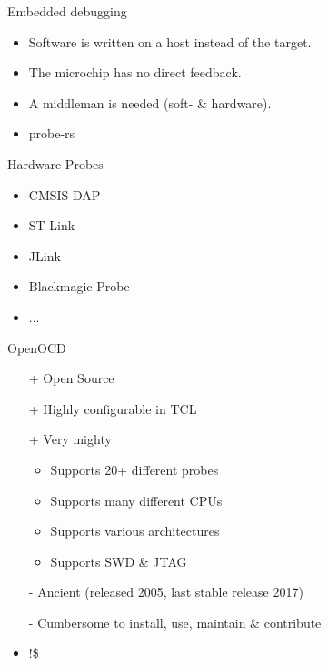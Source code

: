 \documentclass[aspectratio=1610,14pt,t]{beamer}
\begin{document}
\begin{frame}[c]{Embedded debugging}
  \begin{itemize}
    \item Software is written on a host instead of the target.
    \item The microchip has no direct feedback.
    \item A middleman is needed (soft- \& hardware).
    \item probe-rs
  \end{itemize}
\end{frame}

\begin{frame}[c]{Hardware Probes}
  \begin{itemize}
    \item CMSIS-DAP
    \item ST-Link
    \item JLink
    \item Blackmagic Probe
    \item ...
  \end{itemize}
\end{frame}

\begin{frame}[c]{OpenOCD}
  \begin{itemize}
    \item[+] Open Source
    \item[+] Highly configurable in TCL
    \item[+] Very mighty
      \begin{itemize}
        \item Supports 20+ different probes
        \item Supports many different CPUs
        \item Supports various architectures
        \item Supports SWD \& JTAG
      \end{itemize}
    \item[-] Ancient (released 2005, last stable release 2017)
    \item[-] Cumbersome to install, use, maintain \& contribute
    \item !\$ 
  \end{itemize}
\end{frame}
\end{document}
